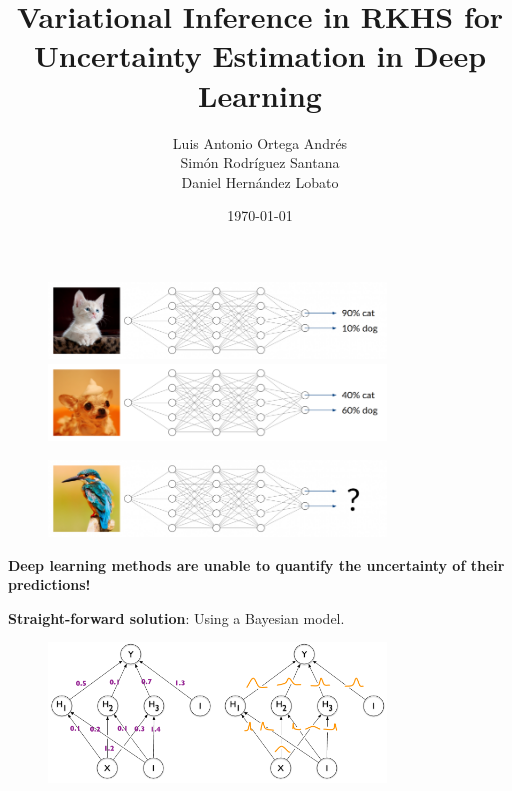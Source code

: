 \documentclass[aspectratio=149]{beamer}
\title{Variational Inference in RKHS for Uncertainty Estimation in Deep Learning}
\date{\today}
\author{Luis Antonio Ortega Andrés\\
Simón Rodríguez Santana\\
Daniel Hernández Lobato\\}
\institute{Autonomous University of Madrid}
\begin{document}
  \maketitle


    {
      \begin{frame}{}
        \begin{figure}
            \centering
            \includegraphics[width = 0.8\textwidth]{slides_imgs/Bildschirmfoto-vom-2019-10-01-11-03-08-768x175.png}
            \includegraphics[width = 0.8\textwidth]{slides_imgs/uncertainty-quantification-dog-768x175.png}
        \end{figure}
    \end{frame}}
    
    {
      \begin{frame}{}
        \begin{figure}
            \centering
            \includegraphics[width = 0.8\textwidth]{slides_imgs/Bildschirmfoto-vom-2019-10-01-11-03-18-768x175.png}
        \end{figure}
        \pause
        \begin{center}
        \textbf{Deep learning methods are unable to quantify the uncertainty of their predictions!}
        \end{center}
    \end{frame}}
    
    {
      \begin{frame}{}
      \textbf{Straight-forward solution}: Using a Bayesian model.
        \begin{figure}
            \centering
            \includegraphics[width = 0.8\textwidth]{slides_imgs/Bayesian-Neural-Network.png}
        \end{figure}
    \end{frame}}
\end{document}
